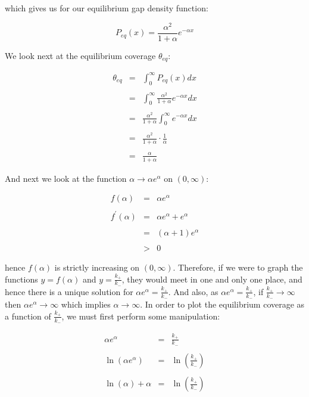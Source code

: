 which gives us for our equilibrium gap density function: \bigskip

\[
	P_{eq}(x) = \frac{\alpha^2}{1 + \alpha} e^{-\alpha x}
\]\medskip

We look next at the equilibrium coverage $\theta_{eq}$: \bigskip

\begin{eqnarray*}
	\theta_{eq} & = & \int_{0}^{\infty} P_{eq}(x) dx \\\\
				& = & \int_{0}^{\infty} \frac{\alpha^2}{1 + \alpha} e^{-\alpha x} dx \\\\
				& = & \frac{\alpha^2}{1 + \alpha} \int_{0}^{\infty} e^{-\alpha x} dx \\\\
				& = & \frac{\alpha^2}{1 + \alpha} \cdot \frac{1}{\alpha} \\\\
				& = & \frac{\alpha}{1 + \alpha} 
\end{eqnarray*}\medskip

And next we look at the function $\alpha \to \alpha e^{\alpha}$ on $(0, \infty)$: \bigskip

\begin{eqnarray*}
			 f(\alpha) & = & \alpha e^{\alpha} \\\\
	f^{\prime}(\alpha) & = & \alpha e^{\alpha} + e^{\alpha} \\\\
					   & = & (\alpha + 1) e^{\alpha} \\\\
					   & > & 0
\end{eqnarray*}\medskip

hence $f(\alpha)$ is strictly increasing on $(0, \infty)$. Therefore, if we were to 
graph the functions $y = f(\alpha)$ and $y = \frac{k_{+}}{k_{-}}$, they would meet 
in one and only one place, and hence there is a unique solution for 
$\alpha e^{\alpha} = \frac{k_{+}}{k_{-}}$. And also, as 
$\alpha e^{\alpha} = \frac{k_{+}}{k_{-}}$, if $\frac{k_{+}}{k_{-}} \to \infty$ 
then $\alpha e^{\alpha} \to \infty$ which implies $\alpha \to \infty$. In order to 
plot the equilibrium coverage as a function of $\frac{k_{+}}{k_{-}}$, we must first 
perform some manipulation: \bigskip

\begin{eqnarray*}
		 \alpha e^{\alpha} & = & \frac{k_{+}}{k_{-}} \\\\
	\ln(\alpha e^{\alpha}) & = & \ln \left( \frac{k_{+}}{k_{-}} \right) \\\\
	  \ln(\alpha) + \alpha & = & \ln \left( \frac{k_{+}}{k_{-}} \right) 
\end{eqnarray*}\medskip

